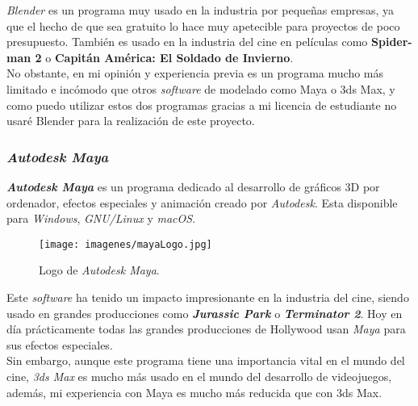 \textit{Blender} es un programa muy usado en la industria por pequeñas empresas, ya que el hecho de que sea gratuito lo hace muy apetecible para proyectos de poco presupuesto. También es usado en la industria del cine en películas como \textbf{Spider-man 2} o \textbf{Capitán América: El Soldado de Invierno}.
\\

No obstante, en mi opinión y experiencia previa es un programa mucho más limitado e incómodo que otros \textit{software} de modelado como Maya o 3ds Max, y como puedo utilizar estos dos programas gracias a mi licencia de estudiante no usaré Blender para la realización de este proyecto.
\\

\subsubsection{\textit{Autodesk Maya}}
	
\textbf{\textit{Autodesk Maya}} es un programa dedicado al desarrollo de gráficos 3D por ordenador, efectos especiales y animación creado por \textit{Autodesk}. Esta disponible para \textit{Windows}, \textit{GNU/Linux} y \textit{macOS}.
\\

\begin{wrapfigure}{l}{0.6\textwidth}
	\vspace{-30pt}
	\begin{center}
		\vspace{-30pt}
		\texttt{[image: imagenes/mayaLogo.jpg]}
		\caption{Logo de \textit{Autodesk Maya}.}
		\vspace{-20pt}
	\end{center}
	\vspace{-30pt}
\end{wrapfigure}

Este \textit{software} ha tenido un impacto impresionante en la industria del cine, siendo usado en grandes producciones como \textit{\textbf{Jurassic Park}} o \textbf{\textit{Terminator 2}}. Hoy en día prácticamente todas las grandes producciones de Hollywood usan \textit{Maya} para sus efectos especiales.
\\

Sin embargo, aunque este programa tiene una importancia vital en el mundo del cine, \textit{3ds Max} es mucho más usado en el mundo del desarrollo de videojuegos, además, mi experiencia con Maya es mucho más reducida que con 3ds Max.
\\	
	
